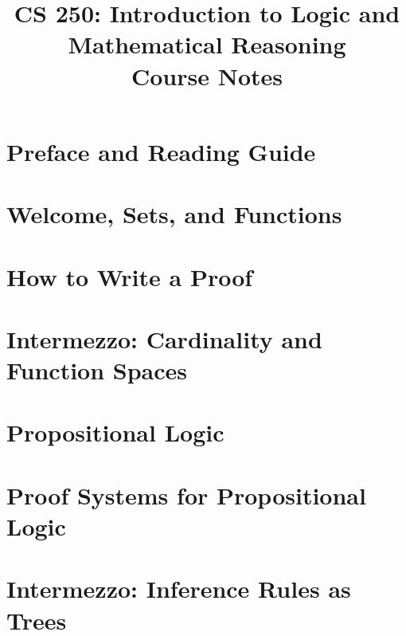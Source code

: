 \documentclass[11pt]{report}
\title{CS 250: Introduction to Logic and\\Mathematical Reasoning\\[10pt]\large Course Notes}
\author{}
\date{}
\begin{document}
\maketitle
\clearpage
{}
\tableofcontents
\clearpage
{}

\def\maketitle{}

\chapter*{Preface and Reading Guide}


\chapter{Welcome, Sets, and Functions}


\chapter*{How to Write a Proof}


\chapter*{Intermezzo: Cardinality and Function Spaces}


\chapter{Propositional Logic}


\chapter{Proof Systems for Propositional Logic}


\chapter*{Intermezzo: Inference Rules as Trees}

\end{document}
